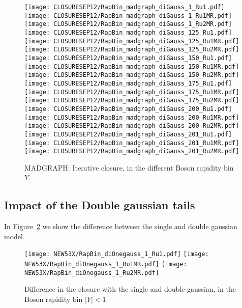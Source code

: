 \documentclass[41pt,a4paper,oneside]{report}
\begin{document}
\begin{figure}[h!]
  \begin{center}
    \texttt{[image: CLOSURESEP12/RapBin\_madgraph\_diGauss\_1\_Ru1.pdf]}
    \texttt{[image: CLOSURESEP12/RapBin\_madgraph\_diGauss\_1\_Ru1MR.pdf]}
    \texttt{[image: CLOSURESEP12/RapBin\_madgraph\_diGauss\_1\_Ru2MR.pdf]}
    \texttt{[image: CLOSURESEP12/RapBin\_madgraph\_diGauss\_125\_Ru1.pdf]}
    \texttt{[image: CLOSURESEP12/RapBin\_madgraph\_diGauss\_125\_Ru1MR.pdf]}
    \texttt{[image: CLOSURESEP12/RapBin\_madgraph\_diGauss\_125\_Ru2MR.pdf]}
    \texttt{[image: CLOSURESEP12/RapBin\_madgraph\_diGauss\_150\_Ru1.pdf]}
    \texttt{[image: CLOSURESEP12/RapBin\_madgraph\_diGauss\_150\_Ru1MR.pdf]}
    \texttt{[image: CLOSURESEP12/RapBin\_madgraph\_diGauss\_150\_Ru2MR.pdf]}
    \texttt{[image: CLOSURESEP12/RapBin\_madgraph\_diGauss\_175\_Ru1.pdf]}
    \texttt{[image: CLOSURESEP12/RapBin\_madgraph\_diGauss\_175\_Ru1MR.pdf]}
    \texttt{[image: CLOSURESEP12/RapBin\_madgraph\_diGauss\_175\_Ru2MR.pdf]}
    \texttt{[image: CLOSURESEP12/RapBin\_madgraph\_diGauss\_200\_Ru1.pdf]}
    \texttt{[image: CLOSURESEP12/RapBin\_madgraph\_diGauss\_200\_Ru1MR.pdf]}
    \texttt{[image: CLOSURESEP12/RapBin\_madgraph\_diGauss\_200\_Ru2MR.pdf]}
    \texttt{[image: CLOSURESEP12/RapBin\_madgraph\_diGauss\_201\_Ru1.pdf]}
    \texttt{[image: CLOSURESEP12/RapBin\_madgraph\_diGauss\_201\_Ru1MR.pdf]}
    \texttt{[image: CLOSURESEP12/RapBin\_madgraph\_diGauss\_201\_Ru2MR.pdf]}
    \caption{MADGRAPH: Iterative closure, in the different Boson rapidity bin $Y$.}
    \label{fig:iterClosureMAD}
  \end{center}
\end{figure}



\subsection{Impact of the Double gaussian tails}
\label{sec:DoubleGaussValid}
In Figure~\ref{fig:OneTwoGauss} we show the difference between the single and double gaussian model.
{\color{magenta}{Need to add the plot wih the impact on the MT and MET tails}}
\begin{figure}[h!]
  \begin{center}
    \texttt{[image: NEW53X/RapBin\_diOnegauss\_1\_Ru1.pdf]}
    \texttt{[image: NEW53X/RapBin\_diOnegauss\_1\_Ru1MR.pdf]}
    \texttt{[image: NEW53X/RapBin\_diOnegauss\_1\_Ru2MR.pdf]}
    \caption{Difference in the closure with the single and double gaussian, in the Boson rapidity bin $|Y|<1$}
    \label{fig:OneTwoGauss}
  \end{center}
\end{figure}
\end{document}
